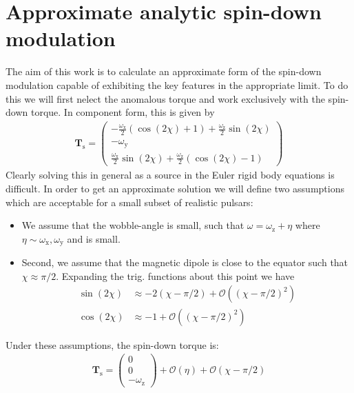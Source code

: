 \documentclass[/home/greg/Thesis/main/main.tex]{subfiles}
\begin{document}
\graphicspath{{/home/greg/Neutron_star_modelling/SpindownRate/PerturbationCalculation/img/}}

\newcommand{\spindown}{\dot{\nu}}
\newcommand{\Aem}{\mathcal{A}_{\mathrm{EM}}}
\newcommand{\Tsd}{\boldsymbol{T}_{\mathrm{s}}}
\newcommand{\wx}{\omega_{\mathrm{x}}}
\newcommand{\wy}{\omega_{\mathrm{y}}}
\newcommand{\wz}{\omega_{\mathrm{z}}}

\section{Approximate analytic spin-down modulation}
The aim of this work is to calculate an approximate form of the spin-down 
modulation capable of exhibiting the key features in the appropriate limit. To 
do this we will first nelect the anomalous torque and work exclusively with the
spin-down torque. In component form, this is given by
\begin{align}
\Tsd = \left(\begin{array}{c}
-\frac{\wx}{2}\left(\cos(2\chi) + 1\right) + \frac{\wz}{2}\sin(2\chi) \\
-\wy \\
\frac{\wx}{2}\sin(2\chi) + \frac{\wz}{2}\left(\cos(2\chi) - 1\right) 
\end{array}\right)
\end{align}
Clearly solving this in general as a source in the Euler rigid body equations is
difficult. In order to get an approximate solution we will define two assumptions
which are acceptable for a small subset of realistic pulsars:
\begin{itemize}
\item We assume that the wobble-angle is small, such that $\omega = \wz + \eta$
      where $\eta \sim \wx, \wy$ and is small.
\item Second, we assume that the magnetic dipole is close to the equator such
      that $\chi \approx \pi/2$. Expanding the trig. functions about this point
      we have
\begin{align}
\sin(2\chi) &\approx -2\left(\chi - \pi/2\right) + \mathcal{O}\left(\left(\chi - \pi/2\right)^{2}\right) \\
\cos(2\chi) &\approx -1 + \mathcal{O}\left(\left(\chi - \pi/2\right)^{2}\right)
\end{align}
\end{itemize}

Under these assumptions, the spin-down torque is:
\begin{align}
\Tsd = \left(\begin{array}{c}
0 \\
0 \\
-\wz 
\end{array}\right) + \mathcal{O}(\eta) + \mathcal{O}(\chi - \pi/2)
\end{align}
\end{document}
